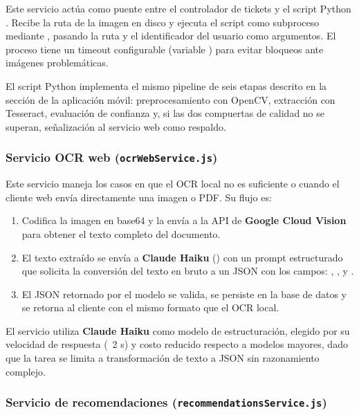 Este servicio actúa como puente entre el controlador de tickets y el
script Python . Recibe la ruta de
la imagen en disco y ejecuta el script como subproceso mediante
, pasando la ruta y el identificador
del usuario como argumentos. El proceso tiene un timeout configurable
(variable ) para evitar bloqueos ante imágenes
problemáticas.

El script Python implementa el mismo pipeline de seis etapas descrito
en la sección de la aplicación móvil: preprocesamiento con OpenCV,
extracción con Tesseract, evaluación de confianza y, si las dos
compuertas de calidad no se superan, señalización al servicio web
como respaldo.

\subsubsection{Servicio OCR web (\texttt{ocrWebService.js})}

\label{sec:srv-ocr-web}

Este servicio maneja los casos en que el OCR local no es suficiente o
cuando el cliente web envía directamente una imagen o PDF. Su flujo es:

\begin{enumerate}
  \item Codifica la imagen en base64 y la envía a la API de
    \textbf{Google Cloud Vision} para obtener el texto completo del
    documento.
  \item El texto extraído se envía a \textbf{Claude Haiku}
    () con un prompt estructurado que
    solicita la conversión del texto en bruto a un JSON con los campos:
    , ,  y
    .
  \item El JSON retornado por el modelo se valida, se persiste en la
    base de datos y se retorna al cliente con el mismo formato que el
    OCR local.
\end{enumerate}

\begin{notabox}
  El servicio utiliza \textbf{Claude Haiku} como modelo de
  estructuración, elegido por su velocidad de respuesta (~2 s) y
  costo reducido respecto a modelos mayores, dado que la tarea
  se limita a transformación de texto a JSON sin razonamiento
  complejo.
\end{notabox}

\subsubsection{Servicio de recomendaciones (\texttt{recommendationsService.js})}

